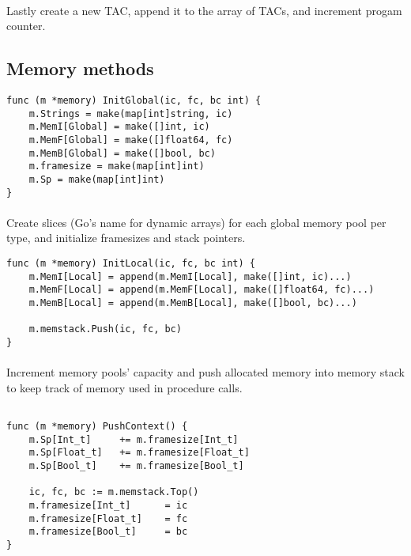 \paragraph{} Lastly create a new TAC, append it to the array of TACs, and
increment progam counter.

\newpage

\subsection{Memory methods}

\begin{verbatim}
func (m *memory) InitGlobal(ic, fc, bc int) {
    m.Strings = make(map[int]string, ic)
    m.MemI[Global] = make([]int, ic)
    m.MemF[Global] = make([]float64, fc)
    m.MemB[Global] = make([]bool, bc)
    m.framesize = make(map[int]int)
    m.Sp = make(map[int]int)
}
\end{verbatim}

\paragraph{} Create slices (Go's name for dynamic arrays) for each global
memory pool per type, and initialize framesizes and stack pointers.

\begin{verbatim}
func (m *memory) InitLocal(ic, fc, bc int) {
    m.MemI[Local] = append(m.MemI[Local], make([]int, ic)...)
    m.MemF[Local] = append(m.MemF[Local], make([]float64, fc)...)
    m.MemB[Local] = append(m.MemB[Local], make([]bool, bc)...)

    m.memstack.Push(ic, fc, bc)
}

\end{verbatim}

\paragraph{} Increment memory pools' capacity and push allocated memory into
memory stack to keep track of memory used in procedure calls.

\begin{verbatim}

func (m *memory) PushContext() {
    m.Sp[Int_t]     += m.framesize[Int_t]
    m.Sp[Float_t]   += m.framesize[Float_t]
    m.Sp[Bool_t]    += m.framesize[Bool_t]

    ic, fc, bc := m.memstack.Top()
    m.framesize[Int_t]      = ic
    m.framesize[Float_t]    = fc
    m.framesize[Bool_t]     = bc
}
\end{verbatim}

